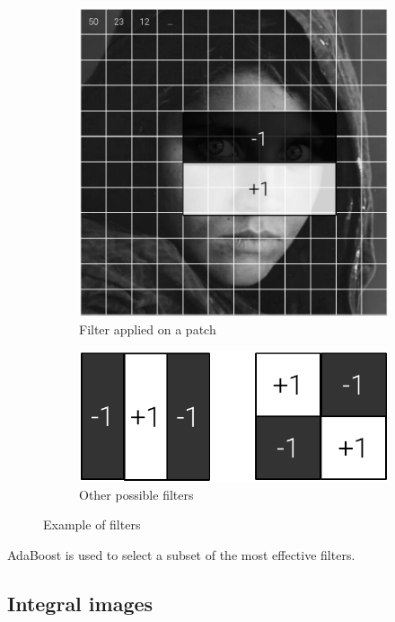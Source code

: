 \begin{description}
        \begin{figure}[H]
            \centering
            \begin{subfigure}{0.6\linewidth}
                \centering
                \includegraphics[width=0.5\linewidth]{./img/_haar_like_example.pdf}
                \caption{Filter applied on a patch}
            \end{subfigure}
            \hfill
            \begin{subfigure}{0.35\linewidth}
                \centering
                \includegraphics[width=0.65\linewidth]{./img/_haar_like_filters_example.pdf}
                \caption{Other possible filters}
            \end{subfigure}
            \caption{Example of filters}
        \end{figure}

        \begin{remark}
            AdaBoost is used to select a subset of the most effective filters.
        \end{remark}
\end{description}


\subsection{Integral images}

